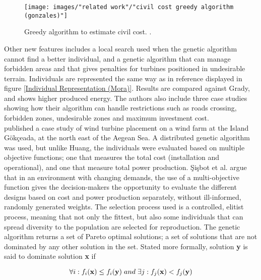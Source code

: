 \begin{figure}[h!]
\begin{center}
\texttt{[image: images/"related work"/"civil cost greedy algorithm (gonzales)"]}
\caption{Greedy algorithm to estimate civil cost. \citep{Gonzalez}.}
\label{Civil Cost Greedy Algorithm (Gonzales)}
\end{center}
\end{figure}


\noindent Other new features includes a local search used when the genetic algorithm cannot find a better individual, and a genetic algorithm that can manage forbidden areas and that gives penalties for turbines positioned in undesirable terrain. Individuals are represented the same way as in reference \citep{Mora} displayed in figure \ref{Individual Representation (Mora)}. Results are compared against Grady, and shows higher produced energy. The authors also include three case studies showing how their algorithm can handle restrictions such as roads crossing, forbidden zones, undesirable zones and maximum investment cost.\\


\noindent \cite{Sisbot} published a case study of wind turbine placement on a wind farm at the Island G{\"o}k\c{c}eada, at the north east of the Aegean Sea. A distributed genetic algorithm was used, but unlike Huang, the individuals were evaluated based on multiple objective functions; one that measures the total cost (installation and operational), and one that measure total power production. \c{S}i\c{s}bot et al. argue that in an environment with changing demands, the use of a multi-objective function gives the decision-makers the opportunity to evaluate the different designs based on cost and power production separately, without ill-informed, randomly generated weights. The selection process used is a controlled, elitist process, meaning that not only the fittest, but also some individuals that can spread diversity to the population are selected for reproduction. The genetic algorithm returns a set of Pareto optimal solutions; a set of solutions that are not dominated by any other solution in the set. Stated more formally, solution \textbf{y} is said to dominate solution \textbf{x} if

\begin{equation}
\forall i: f_i(\textbf{x}) \leq f_i(\textbf{y}) \hspace{1mm} and \hspace{1mm} \exists j: f_j(\textbf{x}) < f_j(\textbf{y}) 
\label{Dominated solutions}
\end{equation}

